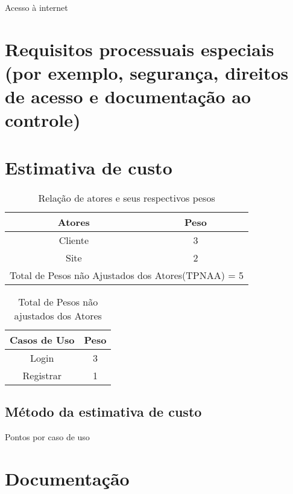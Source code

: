 Acesso à internet

\section{Requisitos processuais especiais (por exemplo, segurança, direitos de acesso e documentação ao controle)}

\section{Estimativa de custo}

\begin{table}[!htb]
	\caption[Atores]{Relação de atores e seus respectivos pesos}
	\label{tab:correlacao}
	\centering
	\begin{tabular}{c|c}
		\hline
		Atores & Peso \\
		\hline
		Cliente & 3 \\
		Site & 2 \\
		\hline
		\multicolumn{4}{c}{Total de Pesos não Ajustados dos Atores(TPNAA) = 5}
	\end{tabular}
\end{table}

\begin{table}[!htb]
	\caption[Atores]{Total de Pesos não ajustados dos Atores}
	\label{tab:correlacao}
	\centering
	\begin{tabular}{c|c}
		\hline
		Casos de Uso & Peso  \\
		\hline
		Login        & 3     \\
		Registrar    & 1     \\
		\hline
	
	\end{tabular}
\end{table}





\subsection{Método da estimativa de custo}

Pontos por caso de uso

\section{Documentação}

